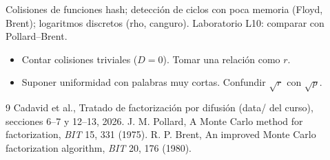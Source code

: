\documentclass[11pt,a4paper]{article}
\begin{document}
\begin{aplicacion}
Colisiones de funciones hash; detección de ciclos con poca memoria (Floyd, Brent); logaritmos discretos (rho, canguro). Laboratorio L10: comparar con Pollard--Brent.
\end{aplicacion}

\begin{error}
\begin{itemize}[nosep]
\item Contar colisiones triviales ($D=0$). \quad Tomar una relación como $r$.
\item Suponer uniformidad con palabras muy cortas. \quad Confundir $\sqrt r$ con $\sqrt p$.
\end{itemize}
\end{error}

\begin{thebibliography}{9}\small
{} Cadavid et al., Tratado de factorización por difusión (data/ del curso), secciones 6--7 y 12--13, 2026.
 J. M. Pollard, A Monte Carlo method for factorization, \emph{BIT} 15, 331 (1975).
 R. P. Brent, An improved Monte Carlo factorization algorithm, \emph{BIT} 20, 176 (1980).
\end{thebibliography}
\end{document}
